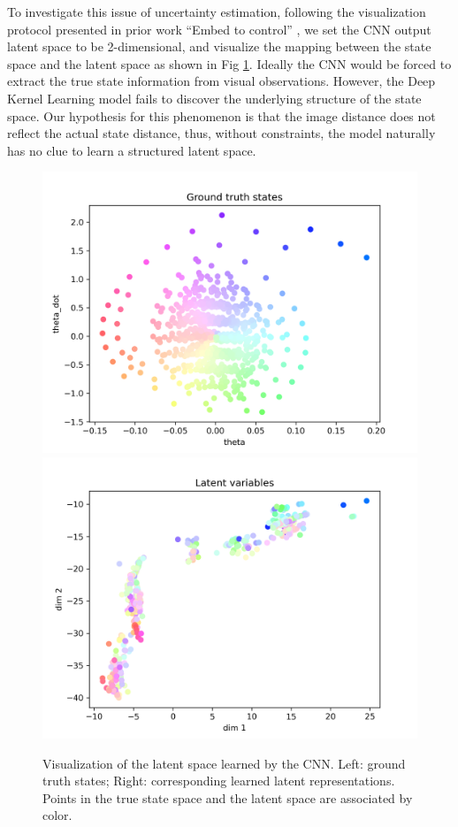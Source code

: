 \documentclass[11pt, reqno, letterpaper, twoside]{amsart}
\begin{document}
To investigate this issue of uncertainty estimation, following the visualization
protocol presented in prior work ``Embed to control'' \cite{watter2015embed}, we
set the CNN output latent space to be 2-dimensional, and visualize the mapping
between the state space and the latent space as shown in Fig \ref{fig:latent}.
Ideally the CNN would be forced to extract the true state information from
visual observations. However, the Deep Kernel Learning model fails to discover
the underlying structure of the state space. Our hypothesis for this phenomenon
is that the image distance does not reflect the actual state distance, thus,
without constraints, the model naturally has no clue to learn a structured
latent space.

\begin{figure}[ht]
	\centering
	\includegraphics[width=0.4\linewidth]{imgs/latentVis_gt_states_0.png}
	\includegraphics[width=0.4\linewidth]{imgs/latentVis_latents_0.png}
	\caption{Visualization of the latent space learned by the CNN. Left: ground truth states; Right: corresponding learned latent representations. Points in the true state space and the latent space are associated by color.}
	\label{fig:latent}
\end{figure}
\end{document}

